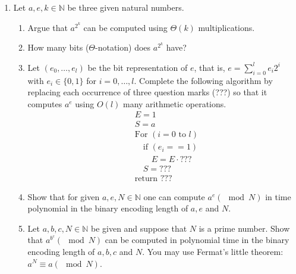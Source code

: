 \documentclass[11pt]{article}
\institute{\'Ecole Polytechnique F\'ed\'erale de Lausanne}
\newcommand{\setN}{\mathbb{N}}
\begin{document}
\makeheader

\begin{enumerate}[1)]



\item Let $a, e, k ∈ \setN$ be three given natural numbers.
\begin{enumerate}
\item Argue that $a^{2^k}$ can be computed using $Θ(k)$ multiplications.
\item How many bits ($Θ$-notation) does $a^{2^k}$ have?
\item Let $(e_0, \hdots, e_l)$ be the bit representation of $e$, that is, $e = \displaystyle\sum_{i= 0}^l e_i2^i$ with $e_i ∈ \{0, 1\}$ for $i= 0, \hdots, l$.
Complete the following algorithm by replacing each occurrence of three question marks (???) so
that it computes $a^e$ using $O(l)$ many arithmetic operations.
\begin{align*}
& E = 1\\
& S = a\\
&\text{For }(i=0 \text{ to }l) \\
& \quad \text{if  }(e_i == 1)\\
& \quad \quad E = E\cdot ??? \\
&\quad S = ??? \\
&\text{return }???
\end{align*}
\item Show that for given $a, e, N ∈ \setN$ one can compute $a^e (\mod N)$ in time polynomial in the binary
encoding length of $a, e$ and $N$.
\item Let $a, b, c, N ∈ \setN$ be given and suppose that $N$ is a prime number. Show that $a^{b^c} (\mod N)$ can
be computed in polynomial time in the binary encoding length of $a, b, c$ and $N$. You may use
Fermat’s little theorem: $a^N ≡ a (\mod N)$.
\end{enumerate}



\end{enumerate}
\end{document}
